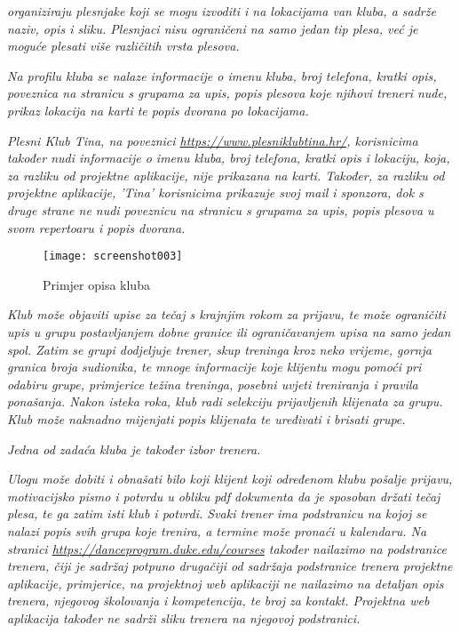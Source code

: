\textit{ organiziraju plesnjake koji se mogu izvoditi i na lokacijama van kluba, a sadrže naziv, opis i sliku. Plesnjaci nisu ograničeni na samo jedan tip plesa, već je moguće plesati više različitih vrsta plesova.}

\textit{Na profilu kluba se nalaze informacije o imenu kluba, broj telefona, kratki opis, poveznica na stranicu s grupama za upis, popis plesova koje njihovi treneri nude, prikaz lokacija na karti te popis dvorana po lokacijama.}

\textit{Plesni Klub Tina, na poveznici \url{https://www.plesniklubtina.hr/}, korisnicima također nudi informacije o imenu kluba, broj telefona, kratki opis i lokaciju, koja, za razliku od projektne aplikacije, nije prikazana na karti. Također, za razliku od projektne aplikacije, 'Tina' korisnicima prikazuje svoj mail i sponzora, dok s druge strane ne nudi poveznicu na stranicu s grupama za upis, popis plesova u svom repertoaru i popis dvorana.}

\begin{figure}[H]
	\centering
	\texttt{[image: screenshot003]}
	\caption{Primjer opisa kluba}
	\label{fig:screenshot003}
\end{figure}

\textit{Klub može objaviti upise za tečaj s krajnjim rokom za prijavu, te može ograničiti upis u grupu postavljanjem dobne granice ili ograničavanjem upisa na samo jedan spol. Zatim se grupi dodjeljuje trener, skup treninga kroz neko vrijeme, gornja granica broja sudionika, te mnoge informacije koje klijentu mogu pomoći pri odabiru grupe, primjerice težina treninga, posebni uvjeti treniranja i pravila ponašanja. Nakon isteka roka, klub radi selekciju prijavljenih klijenata za grupu. Klub može naknadno mijenjati popis klijenata te uređivati i brisati grupe.}

\textit{Jedna od zadaća kluba je također izbor trenera.}

\textit{Ulogu  može dobiti i obnašati bilo koji klijent koji određenom klubu pošalje prijavu, motivacijsko pismo i potvrdu u obliku pdf dokumenta da je sposoban držati tečaj plesa, te ga zatim isti klub i potvrdi. Svaki trener ima podstranicu na kojoj se nalazi popis svih grupa koje trenira, a termine može pronaći u kalendaru. Na stranici \url{https://danceprogram.duke.edu/courses} također nailazimo na podstranice trenera, čiji je sadržaj potpuno drugačiji od sadržaja podstranice trenera projektne aplikacije, primjerice, na projektnoj web aplikaciji ne nailazimo na detaljan opis trenera, njegovog školovanja i kompetencija, te broj za kontakt. Projektna web aplikacija također ne sadrži sliku trenera na njegovoj podstranici.}

